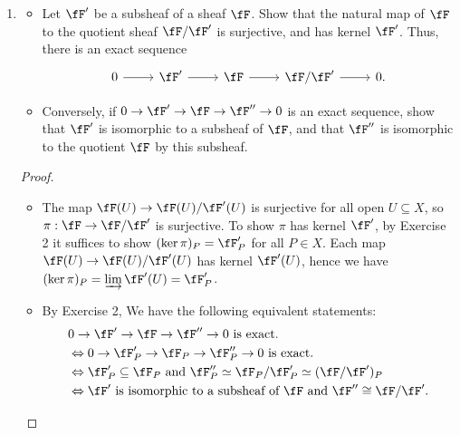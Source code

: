 \documentclass[a4paper]{article}
\begin{document}
\begin{enumerate} [label=\textbf{\arabic*.}, leftmargin=0em]
    \item[\textbf{6.}] \begin{itemize}
              \item[(a)] Let $\fF'$ be a subsheaf of a sheaf $\fF$. Show that the natural map of $\fF$ to the quotient sheaf $\fF / \fF'$ is surjective, and has kernel $\fF'$. Thus, there is an exact sequence
                    \[ \begin{tikzcd}
                            0 \arrow[r] & \fF' \arrow[r] & \fF \arrow[r] & \fF/\fF' \arrow[r] & 0.
                        \end{tikzcd} \]
              \item[(b)] Conversely, if $0 \to \fF' \to \fF \to \fF'' \to 0$ is an exact sequence, show that $\fF'$ is isomorphic to a subsheaf of $\fF$, and that $\fF''$ is isomorphic to the quotient $\fF$ by this subsheaf.
          \end{itemize}

          \begin{proof} $ $ \vspace{0pt}
              \begin{itemize} [leftmargin=0cm]
                  \item[(a)] The map $\fF(U) \to \fF(U) / \fF'(U)$ is surjective for all open $U \subseteq X$, so $\pi : \fF \to \fF / \fF'$ is surjective. To show $\pi$ has kernel $\fF'$, by Exercise 2 it suffices to show $(\ker{\pi})_P = \fF'_P$ for all $P \in X$. Each map $\fF(U) \to \fF(U) / \fF'(U)$ has kernel $\fF'(U)$, hence we have $(\ker{\pi})_P = \varinjlim \fF'(U) = \fF'_P$.

                  \item[(b)] By Exercise 2, We have the following equivalent statements:
                        \begin{align*}
                             & 0 \to \fF' \to \fF \to \fF'' \to 0 \text{ is exact.}                 \\
                             & \Leftrightarrow 0 \to \fF'_P \to \fF_P \to \fF''_P \to 0 \text{ is exact.}      \\
                             & \Leftrightarrow \fF_P' \subseteq \fF_P \text{ and } \fF_P'' \simeq \fF_P / \fF'_P \simeq (\fF / \fF')_P \\
                             & \Leftrightarrow \fF' \text{ is isomorphic to a subsheaf of $\fF$ and } \fF'' \cong \fF / \fF'.
                        \end{align*}
              \end{itemize}
          \end{proof}


\end{enumerate}
\end{document}
